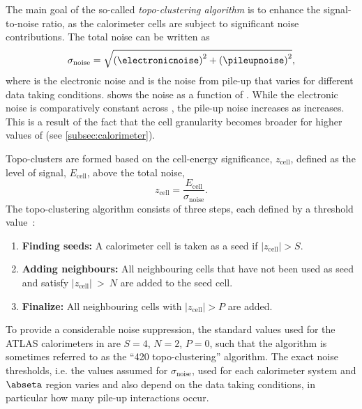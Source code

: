 The main goal of the so-called \emph{topo-clustering algorithm} is to enhance the signal-to-noise ratio, as the calorimeter cells are subject to significant noise contributions. The total noise can be written as
\begin{equation}
    \sigma_{\text{noise}} = \sqrt{ \left( \electronicnoise  \right)^2  + \left( \pileupnoise  \right)^2 },
\end{equation}
where \electronicnoise is the electronic noise and \pileupnoise is the noise from pile-up that varies for different data taking conditions.  shows the noise as a function of \abseta. While the electronic noise is comparatively constant across \abseta, the pile-up noise increases as \abseta increases. This is a result of the fact that the cell granularity becomes broader for higher values of \abseta (see \cref{subsec:calorimeter}).

Topo-clusters are formed based on the cell-energy significance, $z_{\text{cell}}$, defined as the level of signal, $E_{\text{cell}}$, above the total noise,
\begin{equation}
    z_{\text{cell}} = \frac{E_{\text{cell}}}{\sigma_{\text{noise}}}.
\end{equation}
The topo-clustering algorithm consists of three steps, each defined by a threshold value~\cite{PERF-2014-07}:
\begin{enumerate}
    \item \textbf{Finding seeds:} A calorimeter cell is taken as a seed if $|z_{\text{cell}}| > S$.
    \item \textbf{Adding neighbours:} All neighbouring cells that have not been used as seed and satisfy $|z_{\text{cell}}|~>~N$ are added to the seed cell.
    \item \textbf{Finalize: } All neighbouring cells with $|z_{\text{cell}}| > P$ are added.
\end{enumerate}
To provide a considerable noise suppression, the standard values used for the ATLAS calorimeters in \RunTwo are $S = 4$, $N = 2$, $P = 0$, such that the algorithm is sometimes referred to as the ``420 topo-clustering'' algorithm. The exact noise thresholds, i.e. the values assumed for $\sigma_{\text{noise}}$, used for each calorimeter system and $\abseta$ region varies and also depend on the data taking conditions, in particular how many pile-up interactions occur. 


